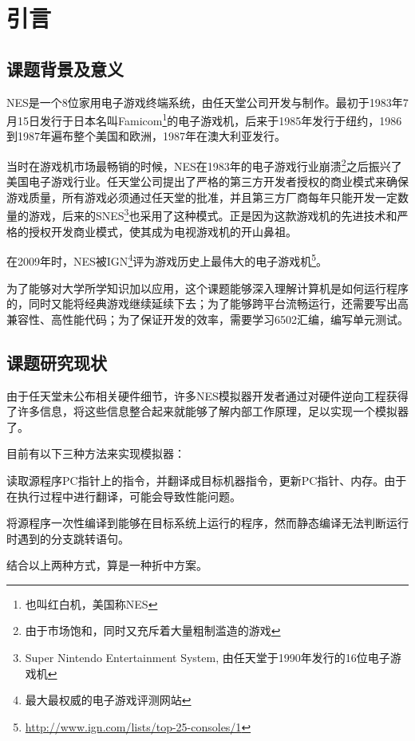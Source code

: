 \documentclass[a4paper]{ltxdoc}
\begin{document}
{
\pretocmd{\section}{\clearpage \vspace*{-2.0em}}{}{}

\setlength{\parindent}{2em}
\setlength{\parskip}{0.5em}
\setlength{\baselineskip}{22pt}

\section{引言}
\subsection{课题背景及意义}
NES是一个8位家用电子游戏终端系统，由任天堂公司开发与制作。最初于1983年7月15日发行于日本名叫Famicom\footnote{也叫红白机，美国称NES}的电子游戏机，后来于1985年发行于纽约，1986到1987年遍布整个美国和欧洲，1987年在澳大利亚发行。

当时在游戏机市场最畅销的时候，NES在1983年的电子游戏行业崩溃\footnote{由于市场饱和，同时又充斥着大量粗制滥造的游戏}之后振兴了美国电子游戏行业。任天堂公司提出了严格的第三方开发者授权的商业模式来确保游戏质量，所有游戏必须通过任天堂的批准，并且第三方厂商每年只能开发一定数量的游戏，后来的SNES\footnote{Super Nintendo Entertainment System, 由任天堂于1990年发行的16位电子游戏机}也采用了这种模式。正是因为这款游戏机的先进技术和严格的授权开发商业模式，使其成为电视游戏机的开山鼻祖。

在2009年时，NES被IGN\footnote{最大最权威的电子游戏评测网站}评为游戏历史上最伟大的电子游戏机\footnote{\url{http://www.ign.com/lists/top-25-consoles/1}}。

为了能够对大学所学知识加以应用，这个课题能够深入理解计算机是如何运行程序的，同时又能将经典游戏继续延续下去；为了能够跨平台流畅运行，还需要写出高兼容性、高性能代码；为了保证开发的效率，需要学习6502汇编，编写单元测试。

\subsection{课题研究现状}
由于任天堂未公布相关硬件细节，许多NES模拟器开发者通过对硬件逆向工程获得了许多信息，将这些信息整合起来就能够了解内部工作原理，足以实现一个模拟器了。

目前有以下三种方法来实现模拟器：
\begin{description}[align=left]
	\item [直接翻译] 读取源程序PC指针上的指令，并翻译成目标机器指令，更新PC指针、内存。由于在执行过程中进行翻译，可能会导致性能问题。
	\item [静态编译] 将源程序一次性编译到能够在目标系统上运行的程序，然而静态编译无法判断运行时遇到的分支跳转语句。
	\item [动态编译] 结合以上两种方式，算是一种折中方案。
\end{description}

}
\end{document}
